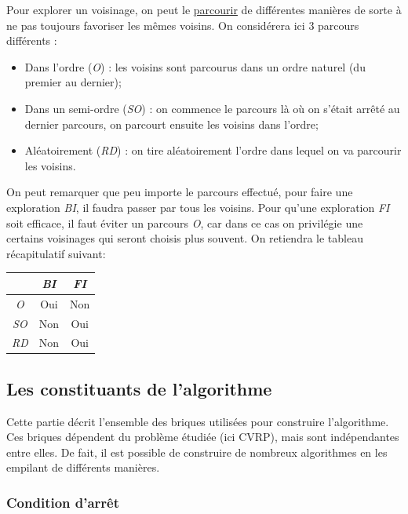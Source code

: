 \documentclass[a4paper,11pt]{article}%
\begin{document}
Pour explorer un voisinage, on peut le \underline{parcourir} de différentes manières de sorte à ne pas toujours favoriser les mêmes voisins. On considérera ici 3 parcours différents : 

\begin{itemize}
\item Dans l'ordre (\emph{O}) : les voisins sont parcourus dans un ordre naturel (du premier au dernier);
\item Dans un semi-ordre (\emph{SO}) : on commence le parcours là où on s'était arrêté au dernier parcours, on parcourt ensuite les voisins dans l'ordre;
\item Aléatoirement (\emph{RD}) : on tire aléatoirement l'ordre dans lequel on va parcourir les voisins. \\
\end{itemize}

On peut remarquer que peu importe le parcours effectué, pour faire une exploration \emph{BI}, il faudra passer par tous les voisins. Pour qu'une exploration \emph{FI} soit efficace, il faut éviter un parcours \emph{O}, car dans ce cas on privilégie une certains voisinages qui seront choisis plus souvent. On retiendra le tableau récapitulatif suivant:

\begin{center}
\begin{tabular}{|c|c|c|}
   \hline
     & \emph{BI} & \emph{FI}  \\
   \hline
   \emph{O} & Oui & Non \\
   \hline
   \emph{SO} & Non & Oui \\
   \hline
   \emph{RD} & Non & Oui  \\
   \hline
\end{tabular}
\end{center}


\subsection{Les constituants de l'algorithme}
Cette partie décrit l'ensemble des briques utilisées pour construire l'algorithme. Ces briques dépendent du problème étudiée (ici CVRP), mais sont indépendantes entre elles. De fait, il est possible de construire de nombreux algorithmes en les empilant de différents manières.

\subsubsection{Condition d'arrêt}
\end{document}
